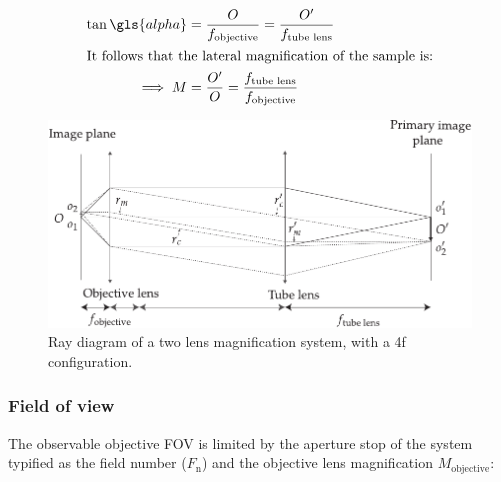 
\begin{align}
    \tan \gls{alpha} &= \frac{O}{f_{\text{objective}}} =  \frac{O'}{f_{\text{tube lens}}} \\
    \intertext{It follows that the lateral magnification of the sample is:}
    \implies M &= \frac{O'}{O} = \frac{f_{\text{tube lens}}}
{f_{\text{objective}}}
\end{align}

\begin{figure}
    \centering
    \includegraphics{./magnification}
    \caption{Ray diagram of a two lens magnification system, with a \gls{4f} configuration.}
    \label{fig:magnification}
\end{figure}






\subsubsection{Field of view}


The observable objective \gls{FOV} is limited by the aperture stop of the system typified as the field number (\(F_\text{n}  \)) and the \gls{objective lens} magnification \(M_{\text{objective}} \):

